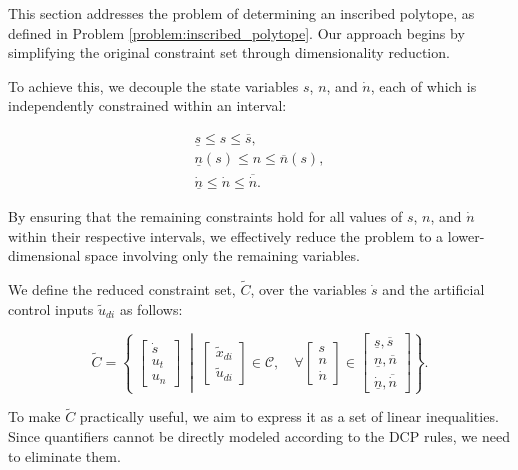 This section addresses the problem of determining an inscribed polytope, as defined in Problem \ref{problem:inscribed_polytope}.
Our approach begins by simplifying the original constraint set through dimensionality reduction.

To achieve this, we decouple the state variables $s$, $n$, and $\dot{n}$, each of which is independently constrained within an interval:

\begin{align}
	\label{eq:state_constraints}
	\underline{s} \leq s \leq \overline{s},       \\
	\underline{n}(s) \leq n \leq \overline{n}(s), \\
	\underline{\dot{n}} \leq \dot{n} \leq \overline{\dot{n}}.
\end{align}

By ensuring that the remaining constraints hold for all values of $s$, $n$, and $\dot{n}$ within their respective intervals, we effectively reduce
the problem to a lower-dimensional space involving only the remaining variables.

We define the reduced constraint set, $\tilde{C}$, over the variables $\dot{s}$ and the artificial control inputs $\tilde{u}_{di}$ as follows:

\begin{equation}
	\tilde{C} =
	\left\{ \;
	\begin{bmatrix}
		\dot{s} \\
		u_t     \\
		u_n
	\end{bmatrix}
	\; \middle|\;
	\begin{bmatrix}
		\tilde{x}_{di} \\ \tilde{u}_{di}
	\end{bmatrix} \in \mathcal{C}, \quad \forall
	\begin{bmatrix}
		s \\
		n \\
		\dot{n}
	\end{bmatrix} \in
	\begin{bmatrix}
		\underline{s}, \overline{s} \\
		\underline{n}, \overline{n} \\
		\underline{\dot{n}}, \overline{\dot{n}}
	\end{bmatrix}
	\right\}.
\end{equation}

To make $\tilde{C}$ practically useful, we aim to express it as a set of linear inequalities.
Since quantifiers cannot be directly modeled according to the DCP rules, we need to eliminate them.

